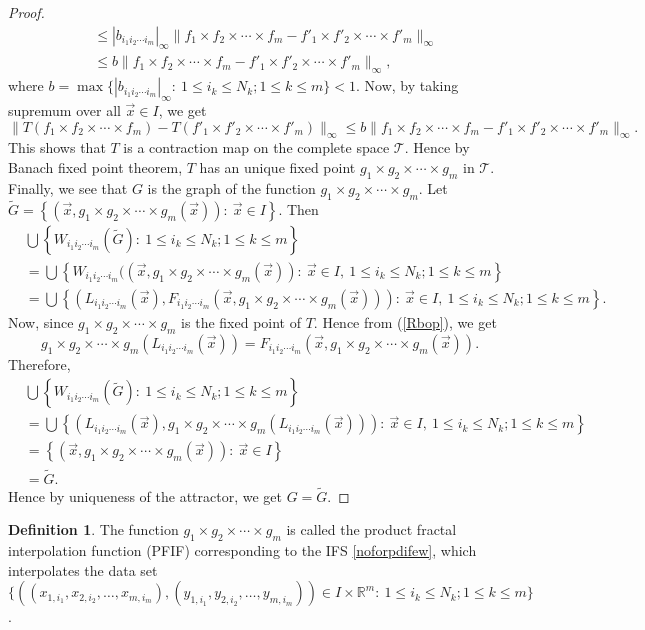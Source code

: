 \documentclass[10pt]{amsart}
\theoremstyle{definition}
\newtheorem{dfn}{Definition}[section]
\newcommand{\myseries}[3]{#1\leq #2\leq #3}
\newcommand{\norm}[2]{\lVert #1 \rVert_#2}
\newcommand{\profunc}[1]{#1_1\times#1_2\times\cdots\times#1_m}
\newcommand{\prodifs}[1]{#1_{i_1i_2\cdots i_m}}
\newcommand{\prodpoint}[2]{#1_{1,#2_1},#1_{2,#2_2},\ldots,#1_{m,#2_m}}
\begin{document}
\begin{proof}
\begin{align*}
			&\leq |\prodifs{b}|_{\infty}\norm{\profunc{f}-\profunc{f'}}{\infty}\\
			&\leq b \norm{\profunc{f}-\profunc{f'}}{\infty},
		\end{align*}
		where  $b=\max\{|\prodifs{b}|_{\infty}:~\myseries{1}{i_k}{N_k};\myseries{1}{k}{m}\}<1$. Now, by taking supremum over all $\vec{x}\in I$, we get
		$$\norm{T(\profunc{f})-T(\profunc{f'})}{\infty}\leq b \norm{\profunc{f}-\profunc{f'}}{\infty}.$$
		This shows that $T$ is a contraction map on the complete space $\mathscr{T}$. Hence by Banach fixed point theorem, $T$ has an unique fixed point $\profunc{g}$ in $\mathscr{T}$. Finally, we see that $G$ is the graph of the function $\profunc{g}$. Let $\tilde{G}=\left\{\left(\vec{x},\profunc{g}(\vec{x})\right):~\vec{x}\in I\right\}$. Then
		\begin{align*}
			&\bigcup\left\{\prodifs{W}(\tilde{G}):~\myseries{1}{i_k}{N_k};\myseries{1}{k}{m}\right\}\\
			&=\bigcup \left\{\prodifs{W}((\vec{x},\profunc{g}(\vec{x})):~\vec{x}\in I,~\myseries{1}{i_k}{N_k};\myseries{1}{k}{m} \right\}\\
			&=\bigcup\left\{\left(\prodifs{L}(\vec{x}),\prodifs{F}(\vec{x},\profunc{g}(\vec{x}))\right):~\vec{x}\in I,~\myseries{1}{i_k}{N_k};\myseries{1}{k}{m}\right\}.
		\end{align*}
		Now, since $\profunc{g}$ is the fixed point of $T$. Hence from (\ref{Rbop}), we get 
		$$\profunc{g}(\prodifs{L}(\vec{x}))=\prodifs{F}(\vec{x},\profunc{g}(\vec{x})).$$
		Therefore,
		\begin{align*}
			&\bigcup\left\{\prodifs{W}(\tilde{G}):~\myseries{1}{i_k}{N_k};\myseries{1}{k}{m}\right\}\\
			&=\bigcup\left\{\left(\prodifs{L}(\vec{x}),\profunc{g}(\prodifs{L}(\vec{x}))\right):~\vec{x}\in I,~\myseries{1}{i_k}{N_k};\myseries{1}{k}{m}\right\}\\	
			&=\left\{\left(\vec{x},\profunc{g}(\vec{x})\right):~\vec{x}\in I\right\}\\
			&=\tilde{G}.
		\end{align*}
		Hence by uniqueness of the attractor, we get $G=\tilde{G}$.
	\end{proof}
	\begin{dfn}
		The function $\profunc{g}$ is called the product fractal interpolation function (PFIF) corresponding to the IFS \ref{noforpdifew}, which interpolates the data set\\ $\{((\prodpoint{x}{i}),(\prodpoint{y}{i}))\in I\times\mathbb{R}^m:~\myseries{1}{i_k}{N_k};\myseries{1}{k}{m}\}$.
	\end{dfn}
\end{document}
